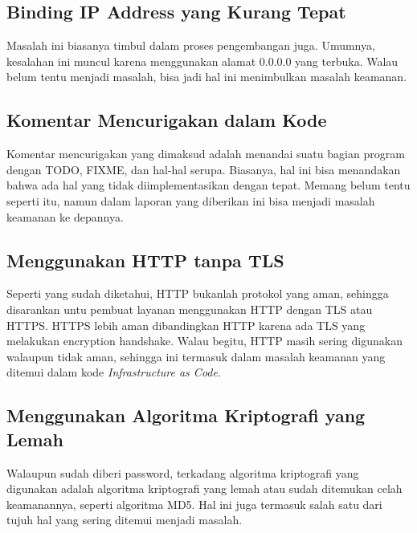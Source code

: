 \subsection{Binding IP Address yang Kurang Tepat}
Masalah ini biasanya timbul dalam proses pengembangan juga. Umumnya, kesalahan ini muncul karena menggunakan alamat 0.0.0.0 yang terbuka. Walau belum tentu menjadi masalah, bisa jadi hal ini menimbulkan masalah keamanan.

\subsection{Komentar Mencurigakan dalam Kode}
Komentar mencurigakan yang dimaksud adalah menandai suatu bagian program dengan TODO, FIXME, dan hal-hal serupa. Biasanya, hal ini bisa menandakan bahwa ada hal yang tidak diimplementasikan dengan tepat. Memang belum tentu seperti itu, namun dalam laporan yang diberikan ini bisa menjadi masalah keamanan ke depannya.

\subsection{Menggunakan HTTP tanpa TLS}
Seperti yang sudah diketahui, HTTP bukanlah protokol yang aman, sehingga disarankan untu pembuat layanan menggunakan HTTP dengan TLS atau HTTPS. HTTPS lebih aman dibandingkan HTTP karena ada TLS yang melakukan encryption handshake. Walau begitu, HTTP masih sering digunakan walaupun tidak aman, sehingga ini termasuk dalam masalah keamanan yang ditemui dalam kode \textit{Infrastructure as Code}.

\subsection{Menggunakan Algoritma Kriptografi yang Lemah}
Walaupun sudah diberi password, terkadang algoritma kriptografi yang digunakan adalah algoritma kriptografi yang lemah atau sudah ditemukan celah keamanannya, seperti algoritma MD5. Hal ini juga termasuk salah satu dari tujuh hal yang sering ditemui menjadi masalah.



